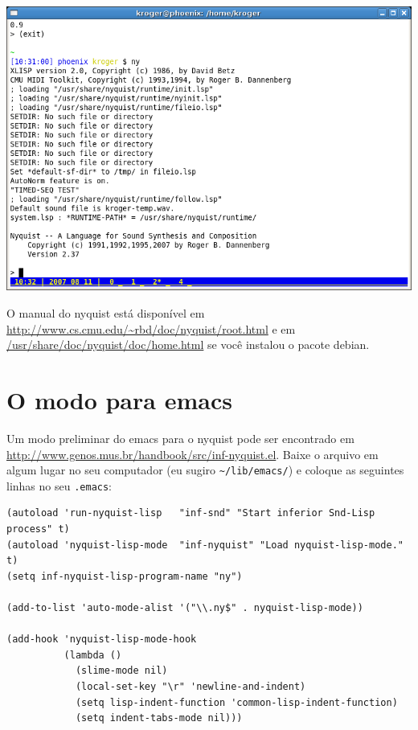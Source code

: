 \documentclass[12pt,brazil]{book}
\begin{document}
\begin{latexonly}
  \includegraphics[scale=.5]{ny1}
\end{latexonly}

O manual do nyquist está disponível em
\url{http://www.cs.cmu.edu/~rbd/doc/nyquist/root.html} e em
\url{/usr/share/doc/nyquist/doc/home.html} se você instalou o pacote
debian.

\section{O modo para emacs}
\label{sec:o-modo-para-2}

Um modo preliminar do emacs para o nyquist pode ser encontrado em
\url{http://www.genos.mus.br/handbook/src/inf-nyquist.el}. Baixe o arquivo em
algum lugar no seu computador (eu sugiro \verb|~/lib/emacs/|) e
coloque as seguintes linhas no seu \texttt{.emacs}:

\begin{verbatim}
(autoload 'run-nyquist-lisp   "inf-snd" "Start inferior Snd-Lisp process" t)
(autoload 'nyquist-lisp-mode  "inf-nyquist" "Load nyquist-lisp-mode." t)
(setq inf-nyquist-lisp-program-name "ny")

(add-to-list 'auto-mode-alist '("\\.ny$" . nyquist-lisp-mode))

(add-hook 'nyquist-lisp-mode-hook
          (lambda ()
            (slime-mode nil)
            (local-set-key "\r" 'newline-and-indent)
            (setq lisp-indent-function 'common-lisp-indent-function)
            (setq indent-tabs-mode nil)))
\end{verbatim}
\end{document}
